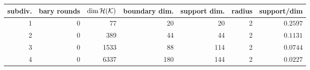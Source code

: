 \begin{tabular}{@{}rrrrrrr@{}}
\toprule
subdiv. & bary rounds & $\dim\mathcal{H}(\mathcal{K})$ & boundary dim. & support dim. & radius & support/dim \\
\midrule
1 & 0 & 77 & 20 & 20 & 2 & $0.2597$ \\
2 & 0 & 389 & 44 & 44 & 2 & $0.1131$ \\
3 & 0 & 1533 & 88 & 114 & 2 & $0.0744$ \\
4 & 0 & 6337 & 180 & 144 & 2 & $0.0227$ \\
\bottomrule
\end{tabular}
